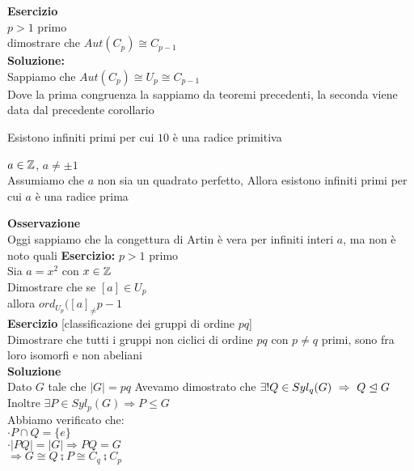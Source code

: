 \documentclass[12px]{article}
\begin{document}
\textbf{Esercizio}\\
$p> 1$ primo\\
dimostrare che  $Aut(C_p)\cong C_{p-1}$\\
\textbf{Soluzione:}\\
Sappiamo che $Aut(C_p)\cong U_p\cong C_{p-1}$\\
Dove la prima congruenza la sappiamo da teoremi precedenti, la seconda viene data dal precedente corollario\\
\begin{congettura}[Gauss, 1801]
	Esistono infiniti primi per cui $10$ è una radice primitiva
\end{congettura}
\begin{congettura}[E. Artin, 1927]
	$a\in\mathbb{Z}$,  $a\neq \pm 1$\\
	Assumiamo che  $a$ non sia un quadrato perfetto, Allora esistono infiniti primi per cui $a $ è una radice prima
\end{congettura}
\textbf{Osservazione}\\
Oggi sappiamo che la congettura di Artin è vera per infiniti interi $a$, ma non è noto quali
\textbf{Esercizio:}
$p > 1$ primo\\
Sia  $a = x^2$ con  $x\in\mathbb{Z}$\\
Dimostrare che se  $[a]\in U_p$\\
allora  $ord_{U_p}([a]_\neq p- 1$\\
\textbf{Esercizio} [classificazione dei gruppi di ordine $pq$]\\
Dimostrare che tutti i gruppi non ciclici di ordine $pq$ con  $p\neq q$ primi, sono fra loro isomorfi e non abeliani\\
\textbf{Soluzione}\\
Dato $G$ tale che $|G| = pq$
Avevamo dimostrato che $\exists ! Q\in Syl_q(G) \ \Rightarrow \ Q\trianglelefteq G$\\
Inoltre $\exists P\in Syl_p(G) \Rightarrow P\leq G$  \\
Abbiamo verificato che:\\
$\cdot P\cap Q = \{e\}$\\
 $\cdot |PQ| = |G| \Rightarrow PQ = G$ \\
 $ \Rightarrow G\cong Q\semi P \cong C_q\semi C_p$
\end{document}
